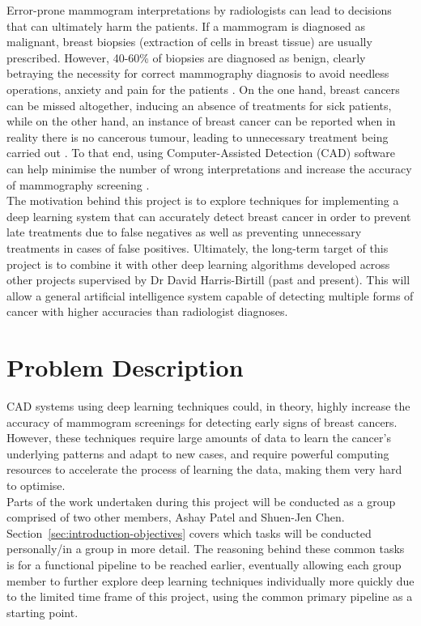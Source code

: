 Error-prone mammogram interpretations by radiologists can lead to decisions that can ultimately harm the patients. If a mammogram is diagnosed as malignant, breast biopsies (extraction of cells in breast tissue) are usually prescribed. However, 40-60\% of biopsies are diagnosed as benign, clearly betraying the necessity for correct mammography diagnosis to avoid needless operations, anxiety and pain for the patients \citep{Hepsag2017}. On the one hand, breast cancers can be missed altogether, inducing an absence of treatments for sick patients, while on the other hand, an instance of breast cancer can be reported when in reality there is no cancerous tumour, leading to unnecessary treatment being carried out \citep{Elter2009}. To that end, using Computer-Assisted Detection (CAD) software can help minimise the number of wrong interpretations and increase the accuracy of mammography screening \citep{Shen2017}.\\

The motivation behind this project is to explore techniques for implementing a deep learning system that can accurately detect breast cancer in order to prevent late treatments due to false negatives as well as preventing unnecessary treatments in cases of false positives. Ultimately, the long-term target of this project is to combine it with other deep learning algorithms developed across other projects supervised by Dr David Harris-Birtill (past and present). This will allow a general artificial intelligence system capable of detecting multiple forms of cancer with higher accuracies than radiologist diagnoses.\\


\section{Problem Description}
\label{sec:problem-description}

CAD systems using deep learning techniques could, in theory, highly increase the accuracy of mammogram screenings for detecting early signs of breast cancers. However, these techniques require large amounts of data to learn the cancer's underlying patterns and adapt to new cases, and require  powerful computing resources to accelerate the process of learning the data, making them very hard to optimise.\\

Parts of the work undertaken during this project will be conducted as a group comprised of two other members, Ashay Patel and Shuen-Jen Chen. Section~\ref{sec:introduction-objectives} covers which tasks will be conducted personally/in a group in more detail. The reasoning behind these common tasks is for a functional pipeline to be reached earlier, eventually allowing each group member to further explore deep learning techniques individually more quickly due to the limited time frame of this project, using the common primary pipeline as a starting point.


